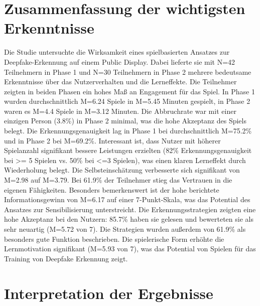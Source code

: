 \section{Zusammenfassung der wichtigsten Erkenntnisse}
Die Studie untersuchte die Wirksamkeit eines spielbasierten Ansatzes zur Deepfake-Erkennung auf einem Public Display. 
Dabei lieferte sie mit N=42 Teilnehmern in Phase 1 und N=30 Teilnehmern in Phase 2 mehrere bedeutsame Erkenntnisse über das Nutzerverhalten und die Lerneffekte. 
Die Teilnehmer zeigten in beiden Phasen ein hohes Maß an Engagement für das Spiel. 
In Phase 1 wurden durchschnittlich M=6.24 Spiele in M=5.45 Minuten gespielt, in Phase 2 waren es M=4.4 Spiele in M=3.12 Minuten. 
Die Abbruchrate war mit einer einzigen Person (3.8\%) in Phase 2 minimal, was die hohe Akzeptanz des Spiels belegt.
Die Erkennungsgenauigkeit lag in Phase 1 bei durchschnittlich M=75.2\% und in Phase 2 bei M=69.2\%. 
Interessant ist, dass Nutzer mit höherer Spielanzahl signifikant bessere Leistungen erzielten (82\% Erkennungsgenauigkeit bei >= 5 Spielen vs. 50\% bei <=3 Spielen), 
was einen klaren Lerneffekt durch Wiederholung belegt.
Die Selbsteinschätzung verbesserte sich signifikant von M=2.98 auf M=3.79. Bei 61.9\% der Teilnehmer stieg das Vertrauen in die eigenen Fähigkeiten. 
Besonders bemerkenswert ist der hohe berichtete Informationsgewinn von M=6.17 auf einer 7-Punkt-Skala, 
was das Potential des Ansatzes zur Sensibilisierung unterstreicht.
Die Erkennungsstrategien zeigten eine hohe Akzeptanz bei den Nutzern: 85.7\% haben sie gelesen und bewerteten sie als sehr neuartig (M=5.72 von 7). 
Die Strategien wurden außerdem von 61.9\% als besonders gute Funktion beschrieben. 
Die spielerische Form erhöhte die Lernmotivation signifikant (M=5.93 von 7), was das Potential von Spielen für das Training von Deepfake Erkennung zeigt.
\section{Interpretation der Ergebnisse}
